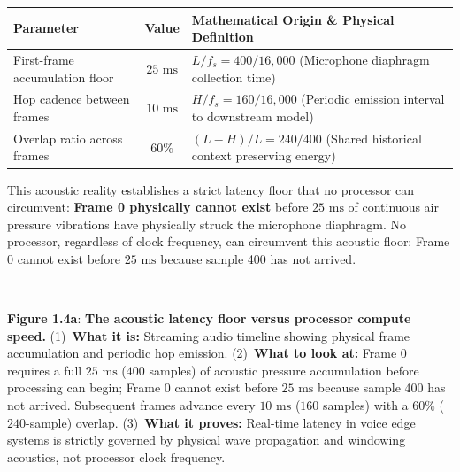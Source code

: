 \documentclass[11pt,a4paper]{article}
\begin{document}
\vspace{-2mm}
\begin{center}
\small
\begin{tabular}{l c p{10.2cm}}
\toprule
\textbf{Parameter} & \textbf{Value} & \textbf{Mathematical Origin \& Physical Definition} \\
\midrule
First-frame accumulation floor & $25\text{ ms}$ & $L / f_s = 400 / 16{,}000$ (Microphone diaphragm collection time) \\
Hop cadence between frames & $10\text{ ms}$ & $H / f_s = 160 / 16{,}000$ (Periodic emission interval to downstream model) \\
Overlap ratio across frames & $60\%$ & $(L - H) / L = 240 / 400$ (Shared historical context preserving energy) \\
\bottomrule
\end{tabular}
\end{center}
\vspace{-3.5mm}

This acoustic reality establishes a strict latency floor that no processor can circumvent: \textbf{Frame 0 physically cannot exist} before $25\text{ ms}$ of continuous air pressure vibrations have physically struck the microphone diaphragm. No processor, regardless of clock frequency, can circumvent this acoustic floor: Frame 0 cannot exist before $25\text{ ms}$ because sample 400 has not arrived.

\vspace{-2.5mm}
\begin{center}
\begin{minipage}{\textwidth}
\centering
\resizebox{0.94\textwidth}{!}{}\\[0.8mm]
\begin{minipage}{0.96\textwidth}
\small\textbf{Figure 1.4a}: \textbf{The acoustic latency floor versus processor compute speed.} (1)~\textbf{What it is:} Streaming audio timeline showing physical frame accumulation and periodic hop emission. (2)~\textbf{What to look at:} Frame 0 requires a full $25\text{ ms}$ ($400$ samples) of acoustic pressure accumulation before processing can begin; Frame 0 cannot exist before $25\text{ ms}$ because sample 400 has not arrived. Subsequent frames advance every $10\text{ ms}$ ($160$ samples) with a $60\%$ ($240$-sample) overlap. (3)~\textbf{What it proves:} Real-time latency in voice edge systems is strictly governed by physical wave propagation and windowing acoustics, not processor clock frequency.
\end{minipage}
\end{minipage}
\end{center}
\vspace{-3.5mm}
\end{document}
